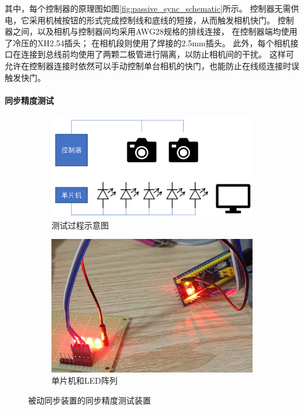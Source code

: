 其中，每个控制器的原理图如图\ref{fig:passive_sync_schematic}所示。
控制器无需供电，它采用机械按钮的形式完成控制线和底线的短接，从而触发相机快门。
控制器之间，以及相机与控制器间均采用AWG28规格的排线连接，
在控制器端均使用了冷压的XH2.54插头；
在相机段则使用了焊接的2.5mm插头。
此外，每个相机接口在连接到总线前均使用了两颗二极管进行隔离，以防止相机间的干扰。
这样可允许在控制器连接时依然可以手动控制单台相机的快门，也能防止在线缆连接时误触发快门。

\paragraph{同步精度测试}

\begin{figure}
\centering
\begin{subfigure}[b]{0.55\textwidth}
    \includegraphics[width=\textwidth]{figures/passive_sync_test}
    \caption{测试过程示意图}
\end{subfigure}%
\begin{subfigure}[b]{0.44\textwidth}
    \includegraphics[width=\textwidth]{figures/LED_array}
    \caption{单片机和LED阵列}
\end{subfigure}%
\caption{被动同步装置的同步精度测试装置}
\label{fig:passive_sync_test}
\end{figure}

